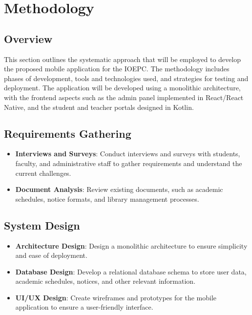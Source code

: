 \chapter{Methodology}

\section{Overview}
This section outlines the systematic approach that will be employed to develop the proposed mobile application for the IOEPC. The methodology includes phases of development, tools and technologies used, and strategies for testing and deployment. The application will be developed using a monolithic architecture, with the frontend aspects such as the admin panel implemented in React/React Native, and the student and teacher portals designed in Kotlin.

\section{Requirements Gathering}
\begin{itemize}
    \item \textbf{Interviews and Surveys}: Conduct interviews and surveys with students, faculty, and administrative staff to gather requirements and understand the current challenges.
    \item \textbf{Document Analysis}: Review existing documents, such as academic schedules, notice formats, and library management processes.
\end{itemize}

\section{System Design}
\begin{itemize}
    \item \textbf{Architecture Design}: Design a monolithic architecture to ensure simplicity and ease of deployment.
    \item \textbf{Database Design}: Develop a relational database schema to store user data, academic schedules, notices, and other relevant information.
    \item \textbf{UI/UX Design}: Create wireframes and prototypes for the mobile application to ensure a user-friendly interface.
\end{itemize}

